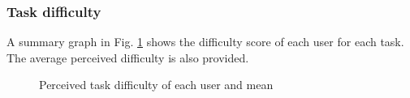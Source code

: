 \subsubsection{Task difficulty}
    A summary graph in Fig. \ref{ResultsDifficulty} shows the difficulty score of each user for each task. The average perceived difficulty is also provided.
    \begin{figure}[!ht]
        \begin{minipage}{\linewidth}
            \centering
            \captionsetup{justification=centering}
            \caption{Perceived task difficulty of each user and mean}
            \label{ResultsDifficulty}
        \end{minipage}
    \end{figure}


